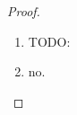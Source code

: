 \documentclass{article}
\theoremstyle{plain}
\theoremstyle{remark}
\renewcommand{\phi}{\varphi}
\newcommand\TODO{{\color{red} TODO: }}
\begin{document}
\begin{proof}
	\begin{enumerate}
		\item \TODO
		\item no.
	\end{enumerate}
\end{proof}
\end{document}
